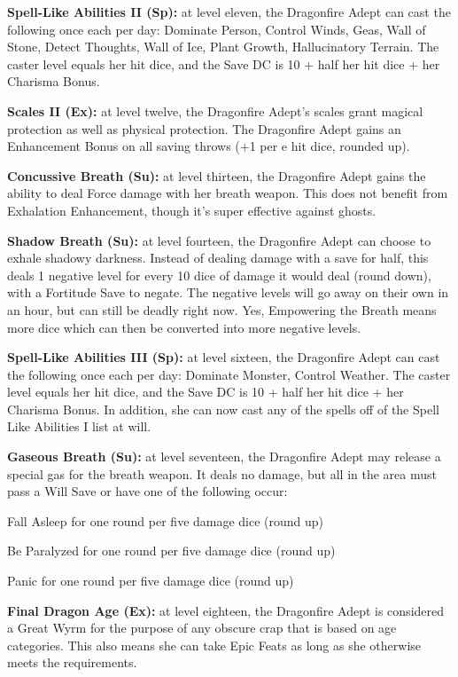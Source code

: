 \textbf{Spell-Like Abilities II (Sp):} at level eleven, the Dragonfire Adept can cast the following once each per day: Dominate Person, Control Winds, Geas, Wall of Stone, Detect Thoughts, Wall of Ice, Plant Growth, Hallucinatory Terrain. The caster level equals her hit dice, and the Save DC is 10 + half her hit dice + her Charisma Bonus.

\textbf{Scales II (Ex):} at level twelve, the Dragonfire Adept's scales grant magical protection as well as physical protection. The Dragonfire Adept gains an Enhancement Bonus on all saving throws (+1 per e hit dice, rounded up).

\textbf{Concussive Breath (Su):} at level thirteen, the Dragonfire Adept gains the ability to deal Force damage with her breath weapon. This does not benefit from Exhalation Enhancement, though it's super effective against ghosts.

\textbf{Shadow Breath (Su):} at level fourteen, the Dragonfire Adept can choose to exhale shadowy darkness. Instead of dealing damage with a save for half, this deals 1 negative level for every 10 dice of damage it would deal (round down), with a Fortitude Save to negate. The negative levels will go away on their own in an hour, but can still be deadly right now. Yes, Empowering the Breath means more dice which can then be converted into more negative levels.

\textbf{Spell-Like Abilities III (Sp):} at level sixteen, the Dragonfire Adept can cast the following once each per day: Dominate Monster, Control Weather. The caster level equals her hit dice, and the Save DC is 10 + half her hit dice + her Charisma Bonus. In addition, she can now cast any of the spells off of the Spell Like Abilities I list at will.

\textbf{Gaseous Breath (Su):} at level seventeen, the Dragonfire Adept may release a special gas for the breath weapon. It deals no damage, but all in the area must pass a Will Save or have one of the following occur:

\begin{itemize*}
\item Fall Asleep for one round per five damage dice (round up)
\item Be Paralyzed for one round per five damage dice (round up)
\item Panic for one round per five damage dice (round up)
\end{itemize*}

\textbf{Final Dragon Age (Ex):} at level eighteen, the Dragonfire Adept is considered a Great Wyrm for the purpose of any obscure crap that is based on age categories. This also means she can take Epic Feats as long as she otherwise meets the requirements.

